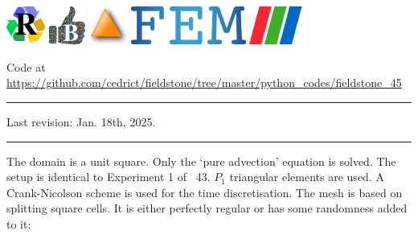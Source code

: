 \includegraphics[height=1.25cm]{images/pictograms/replication}
\includegraphics[height=1.25cm]{images/pictograms/benchmark}
\includegraphics[height=1.25cm]{images/pictograms/triangle}
\includegraphics[height=1.25cm]{images/pictograms/FEM}
\includegraphics[height=1.25cm]{images/pictograms/paraview}


%

\begin{center}
\inpython
Code at \url{https://github.com/cedrict/fieldstone/tree/master/python_codes/fieldstone_45}
\end{center}

\par\noindent\rule{\textwidth}{0.4pt}

Last revision: Jan. 18th, 2025.

\par\noindent\rule{\textwidth}{0.4pt}


The domain is a unit square. Only the `pure advection' equation is solved. 
The setup is identical to Experiment 1 of \stone~43. 
$P_1$ triangular elements are used. A Crank-Nicolson scheme is used for the time
discretisation. The mesh is based on splitting square cells. It is either  
perfectly regular or has some randomness added to it:

